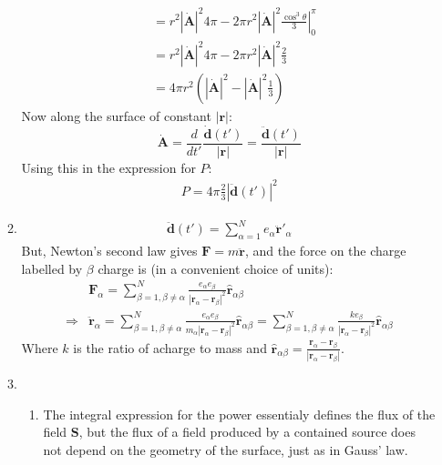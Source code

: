 \documentclass[12pt,a4]{article}
\begin{document}
\begin{enumerate}
\begin{enumerate}
\begin{align*}
            &= r^2\left|\dot{\mathbf{A}}\right|^2 4\pi - 2\pi r^2\left|\dot{\mathbf{A}}\right|^2\left.\frac{\cos^3\theta}{3}\right|_0^\pi \\
            &= r^2\left|\dot{\mathbf{A}}\right|^2 4\pi - 2\pi r^2\left|\dot{\mathbf{A}}\right|^2\frac{2}{3} \\
            &= 4\pi r^2\left(\left|\dot{\mathbf{A}}\right|^2  - \left|\dot{\mathbf{A}}\right|^2\frac{1}{3}\right)
        \end{align*}
        Now along the surface of constant $\left|\mathbf{r}\right|$:
        \begin{equation*}
          \dot{\mathbf{A}} = \frac{d}{dt'} \frac{\dot{\mathbf{d}}(t')}{|\mathbf{r}|} = \frac{\ddot{\mathbf{d}}(t')}{|\mathbf{r}|}
        \end{equation*}
        Using this in the expression for $P$:
        \begin{align*}
          P = 4\pi \frac{2}{3} |\ddot{\mathbf{d}}(t')|^2
        \end{align*}
      \item
        \begin{align*}
          \ddot{\mathbf{d}}(t') = \sum_{\alpha = 1}^{N} e_\alpha \ddot{\mathbf{r}}'_\alpha
        \end{align*}
        But, Newton's second law gives $\mathbf{F} = m\ddot{\mathbf{r}}$, and the force on the charge labelled by $\beta$ charge is (in a convenient choice of units):
        \begin{align*}
          & \mathbf{F}_\alpha= \sum_{\beta = 1, \beta \neq \alpha}^N \frac{e_\alpha e_\beta}{|\mathbf{r}_\alpha - \mathbf{r}_\beta|^2} \hat{\mathbf{r}}_{\alpha\beta}\\
          \Rightarrow & \ddot{\mathbf{r}}_{\alpha} = \sum_{\beta = 1, \beta \neq \alpha }^N \frac{e_\alpha e_\beta}{m_\alpha|\mathbf{r}_\alpha - \mathbf{r}_\beta|^2} \hat{\mathbf{r}}_{\alpha\beta} = \sum_{\beta = 1, \beta \neq \alpha }^N \frac{k e_\beta }{|\mathbf{r}_\alpha - \mathbf{r}_\beta|^2} \hat{\mathbf{r}}_{\alpha\beta}
        \end{align*}
        Where $k$ is the ratio of acharge to mass and $\hat{\mathbf{r}}_{\alpha\beta} = \frac{\mathbf{r}_\alpha - \mathbf{r}_\beta}{|\mathbf{r}_\alpha - \mathbf{r}_\beta|}$.
      \item
        \begin{enumerate}
          \item
            The integral expression for the power essentialy defines the flux of the field $\mathbf{S}$, but the flux of a field produced by a contained source does not depend on the geometry of the surface, just as in Gauss' law.

\end{enumerate}
\end{enumerate}
\end{enumerate}
\end{document}
